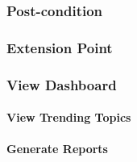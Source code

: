 \subsubsection{Post-condition}

\subsubsection{Extension Point}
\subsubsection*{View Dashboard}

\paragraph*{View Trending Topics}

\paragraph*{Generate Reports}